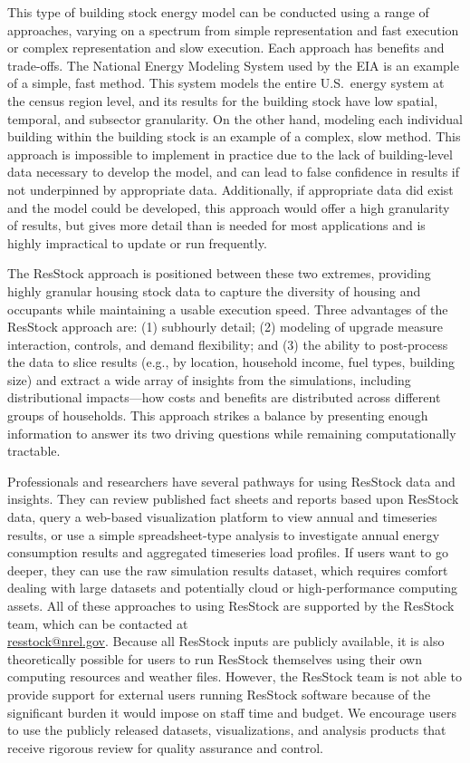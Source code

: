 This type of building stock energy model can be conducted using a range of approaches, varying on a spectrum from simple representation and fast execution or complex representation and slow execution. Each approach has benefits and trade-offs. The National Energy Modeling System used by the EIA is an example of a simple, fast method. This system models the entire U.S.~energy system at the census region level, and its results for the building stock have low spatial, temporal, and subsector granularity. On the other hand, modeling each individual building within the building stock is an example of a complex, slow method. This approach is impossible to implement in practice due to the lack of building-level data necessary to develop the model, and can lead to false confidence in results if not underpinned by appropriate data. Additionally, if appropriate data did exist and the model could be developed, this approach would offer a high granularity of results, but gives more detail than is needed for most applications and is highly impractical to update or run frequently.

The ResStock approach is positioned between these two extremes, providing highly granular housing stock data to capture the diversity of housing and occupants while maintaining a usable execution speed. Three advantages of the ResStock approach are: (1) subhourly detail; (2) modeling of upgrade measure interaction, controls, and demand flexibility; and (3) the ability to post-process the data to slice results (e.g., by location, household income, fuel types, building size) and extract a wide array of insights from the simulations, including distributional impacts---how costs and benefits are distributed across different groups of households. This approach strikes a balance by presenting enough information to answer its two driving questions while remaining computationally tractable.  

Professionals and researchers have several pathways for using ResStock data and insights. They can review published fact sheets and reports based upon ResStock data, query a web-based visualization platform to view annual and timeseries results, or use a simple spreadsheet-type analysis to investigate annual energy consumption results and aggregated timeseries load profiles. If users want to go deeper, they can use the raw simulation results dataset, which requires comfort dealing with large datasets and potentially cloud or high-performance computing assets. All of these approaches to using ResStock are supported by the ResStock team, which can be contacted at \\
\href{mailto:resstock@nrel.gov}{resstock@nrel.gov}. Because all ResStock inputs are publicly available, it is also theoretically possible for users to run ResStock themselves using their own computing resources and weather files. However, the ResStock team is not able to provide support for external users running ResStock software because of the significant burden it would impose on staff time and budget. We encourage users to use the publicly released datasets, visualizations, and analysis products that receive rigorous review for quality assurance and control.

